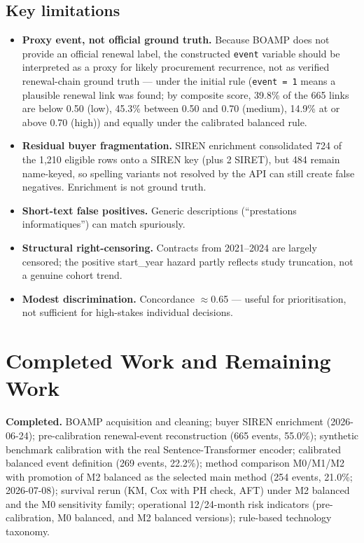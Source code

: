 \documentclass[11pt,a4paper]{article}
\begin{document}
\subsection{Key limitations}
\begin{itemize}[leftmargin=1.4em,itemsep=2pt]
  \item \textbf{Proxy event, not official ground truth.} Because BOAMP does not
        provide an official renewal label, the constructed \texttt{event}
        variable should be interpreted as a proxy for likely procurement
        recurrence, not as verified renewal-chain ground truth --- under the
        initial rule (\texttt{event = 1} means a plausible renewal link was
        found; by composite score, 39.8\% of the 665 links are below 0.50 (low),
        45.3\% between 0.50 and 0.70 (medium), 14.9\% at or above 0.70 (high))
        and equally under the calibrated balanced rule.
  \item \textbf{Residual buyer fragmentation.} SIREN enrichment consolidated 724
        of the 1{,}210 eligible rows onto a SIREN key (plus 2 SIRET), but 484 remain
        name-keyed, so spelling variants not resolved by the API can still create
        false negatives. Enrichment is not ground truth.
  \item \textbf{Short-text false positives.} Generic descriptions
        (``prestations informatiques'') can match spuriously.
  \item \textbf{Structural right-censoring.} Contracts from 2021--2024 are largely
        censored; the positive start\_year hazard partly reflects study truncation,
        not a genuine cohort trend.
  \item \textbf{Modest discrimination.} Concordance $\approx$0.65 --- useful for
        prioritisation, not sufficient for high-stakes individual decisions.
\end{itemize}

\section{Completed Work and Remaining Work}
\label{sec:open}

\textbf{Completed.} BOAMP acquisition and cleaning; buyer SIREN enrichment
(2026-06-24); pre-calibration renewal-event reconstruction (665 events,
55.0\%); synthetic benchmark calibration with the real Sentence-Transformer
encoder; calibrated balanced event definition (269 events, 22.2\%);
method comparison M0/M1/M2 with promotion of M2 balanced as the selected main
method (254 events, 21.0\%; 2026-07-08); survival rerun (KM, Cox with PH
check, AFT) under M2 balanced and the M0 sensitivity family; operational
12/24-month risk indicators (pre-calibration, M0 balanced, and M2 balanced
versions); rule-based technology taxonomy.
\end{document}
